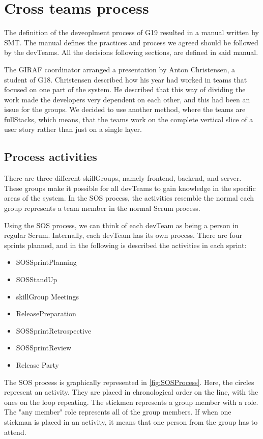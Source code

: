 \section{Cross teams process}
The definition of the deveoplment process of \gls{G19} resulted in a manual\cite{processManual} written by \gls{SMT}. The manual defines the practices and process we agreed should be followed by the \glspl{devTeam}. All the decisions following sections, are defined in said manual.

The GIRAF coordinator arranged a presentation by Anton Christensen, a student of \gls{G18}.
Christensen described how his year had worked in teams that focused on one part of the system. 
He described that this way of dividing the work made the developers very dependent on each other, and this had been an issue for the groups. 
We decided to use another method, where the teams are \Glspl{fullStack}, which means, that the teams work on the complete vertical slice of a user story rather than just on a single layer. 

\subsection{Process activities}
There are three different \glspl{skillGroup}, namely frontend, backend, and server. These groups make it possible for all \glspl{devTeam} to gain knowledge in the specific areas of the system.
In the \gls{SOS} process, the activities resemble the normal each group represents a team member in the normal Scrum process.

Using the \gls{SOS} process, we can think of each \gls{devTeam} as being a person in regular Scrum. Internally, each \gls{devTeam} has its own process. 
There are four sprints planned, and in the following is described the activities in each sprint:

\begin{itemize}
    \item \Gls{SOSSprintPlanning}
    \item \Gls{SOSStandUp}
    \item \Gls{skillGroup} Meetings
    \item \Gls{ReleasePreparation}
    \item \Gls{SOSSprintRetrospective}
    \item \Gls{SOSSprintReview}
    \item Release Party
\end{itemize}

The SOS process is graphically represented in \autoref{fig:SOSProcess}. Here, the circles represent an activity. They are placed in chronological order on the line, with the ones on the loop repeating. The stickmen represents a group member with a role. The "any member" role represents all of the group members. If when one stickman is placed in an activity, it means that one person from the group has to attend. 


